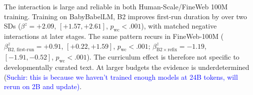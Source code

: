 \documentclass[11pt]{article}
\newcommand{\suchir}[1]{\textcolor{blue}{Suchir: #1}}
\begin{document}
The interaction is large and reliable in both Human-Scale/FineWeb 100M training. Training on BabyBabelLM, B2 improves first-run duration by over two SDs ($\beta^{z}{=}{+}2.09$, $[+1.57, +2.61]$, $p_{\mathrm{wc}}{<}.001$), with matched negative interactions at later stages. The same pattern recurs in FineWeb-100M ($\beta^{z}_{\mathrm{B2,\,first\text{-}run}}{=}{+}0.91$, $[+0.22, +1.59]$, $p_{\mathrm{wc}}{<}.001$; $\beta^{z}_{\mathrm{B2}\times\mathrm{refix}}{=}{-}1.19$,
$[-1.91, -0.52]$, $p_{\mathrm{wc}}{<}.001$). The curriculum effect is therefore not specific to developmentally curated text. At larger budgets the evidence is underdetermined (\suchir{this is because we haven't trained enough models at 24B tokens, will rerun on 2B and update)}. 




\end{document}
